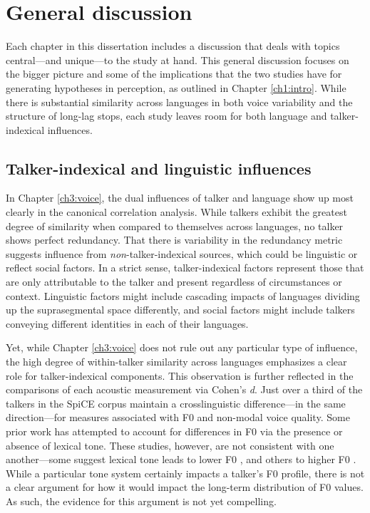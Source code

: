 \section{General discussion}\label{ch5:sec:discussion}

Each chapter in this dissertation includes a discussion that deals with topics central---and unique---to the study at hand. This general discussion focuses on the bigger picture and some of the implications that the two studies have for generating hypotheses in perception, as outlined in Chapter \ref{ch1:intro}. While there is substantial similarity across languages in both voice variability and the structure of long-lag stops, each study leaves room for both language and talker-indexical influences. 

\subsection{Talker-indexical and linguistic influences}

In Chapter \ref{ch3:voice}, the dual influences of talker and language show up most clearly in the canonical correlation analysis. While talkers exhibit the greatest degree of similarity when compared to themselves across languages, no talker shows perfect redundancy. That there is variability in the redundancy metric suggests influence from \textit{non}-talker-indexical sources, which could be linguistic or reflect social factors. In a strict sense, talker-indexical factors represent those that are only attributable to the talker and present regardless of circumstances or context. Linguistic factors might include cascading impacts of languages dividing up the suprasegmental space differently, and social factors might include talkers conveying different identities in each of their languages. 

Yet, while Chapter \ref{ch3:voice} does not rule out any particular type of influence, the high degree of within-talker similarity across languages emphasizes a clear role for talker-indexical components. This observation is further reflected in the comparisons of each acoustic measurement via Cohen's \textit{d}. Just over a third of the talkers in the SpiCE corpus maintain a crosslinguistic difference---in the same direction---for measures associated with F0 and non-modal voice quality. Some prior work has attempted to account for differences in F0 via the presence or absence of lexical tone. These studies, however, are not consistent with one another---some suggest lexical tone leads to lower F0 \citep{ng_2012_ltas}, and others to higher F0 \citep{lee_2017_bilingual, keating_2012_f0}. While a particular tone system certainly impacts a talker's F0 profile, there is not a clear argument for how it would impact the long-term distribution of F0 values. As such, the evidence for this argument is not yet compelling. 

